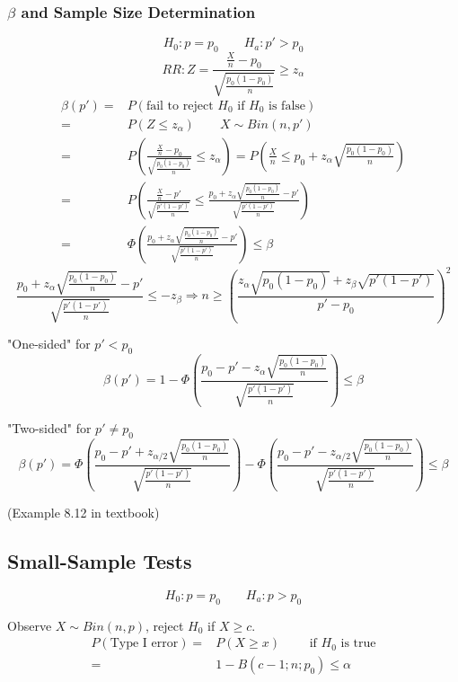 \subsubsection{$\beta$ and Sample Size Determination}
\[H_0:p=p_0 \qquad H_a:p'>p_0\]
\[RR:Z=\frac{\frac{X}{n}-p_0}{\sqrt{\frac{p_0(1-p_0)}{n}}}\geq z_{\alpha}\]
\begin{align*}
\beta(p') =& P(\text{fail to reject }H_0 \text{ if }H_0 \text{ is false}) \\
= & P(Z\leq z_{\alpha}) \qquad X \sim Bin(n,p') \\
= & P\left(\frac{\frac{X}{n}-p_0}{\sqrt{\frac{p_0(1-p_0)}{n}}} \leq z_{\alpha}\right) = P\left(\frac{X}{n}\leq p_0+z_{\alpha}\sqrt{\frac{p_0(1-p_0)}{n}} \right) \\
= & P\left( \frac{\frac{X}{n}-p'}{\sqrt{\frac{p'(1-p')}{n}}}  \leq \frac{p_0+z_{\alpha}\sqrt{\frac{p_0(1-p_0)}{n}}-p'}{\sqrt{\frac{p'(1-p')}{n}}} \right) \\
= & \Phi\left(\frac{p_0+z_{\alpha}\sqrt{\frac{p_0(1-p_0)}{n}}-p'}{\sqrt{\frac{p'(1-p')}{n}}}\right) \leq \beta
\end{align*}
\[\frac{p_0+z_{\alpha}\sqrt{\frac{p_0(1-p_0)}{n}}-p'}{\sqrt{\frac{p'(1-p')}{n}}} \leq -z_{\beta} \Rightarrow n \geq \left( \frac{z_{\alpha}\sqrt{p_0(1-p_0)}+z_{\beta}\sqrt{p'(1-p')}}{p'-p_0}\right)^2\]

"One-sided" for $p'<p_0$
\[\beta(p')= 1- \Phi\left(\frac{p_0-p'-z_{\alpha}\sqrt{\frac{p_0(1-p_0)}{n}}}{\sqrt{\frac{p'(1-p')}{n}}}\right) \leq \beta \]

"Two-sided" for $p'\neq p_0$
\[\beta(p')= \Phi\left(\frac{p_0-p'+z_{\alpha/2}\sqrt{\frac{p_0(1-p_0)}{n}}}{\sqrt{\frac{p'(1-p')}{n}}}\right)- \Phi\left(\frac{p_0-p'-z_{\alpha/2}\sqrt{\frac{p_0(1-p_0)}{n}}}{\sqrt{\frac{p'(1-p')}{n}}}\right) \leq \beta \]

\begin{exmp}
(Example 8.12 in textbook)
\end{exmp}

\subsection{Small-Sample Tests}
\[H_0:p=p_0 \qquad H_a:p>p_0\]

Observe $X \sim Bin(n,p)$, reject $H_0$ if $X\geq c$.
\begin{align*}
P(\text{Type I error})= & P(X \geq x) \qquad \text{ if }H_0 \text{ is true} \\
= & 1- B(c-1;n;p_0) \leq\alpha
\end{align*}

